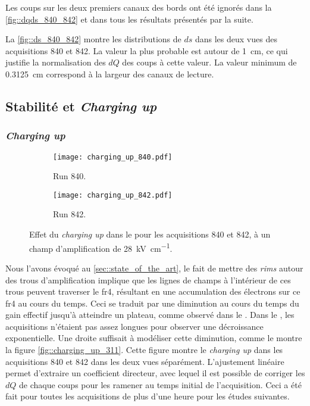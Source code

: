       Les coups sur les deux premiers canaux des bords ont été ignorés dans la \autoref{fig::dqds_840_842} et dans tous les résultats présentés par la suite.

      La \autoref{fig::ds_840_842} montre les distributions de $ds$ dans les deux vues des acquisitions 840 et 842. La valeur la plus probable est autour de \SI{1}{\centi\meter}, ce qui justifie la normalisation des $dQ$ des coups à cette valeur. La valeur minimum de \SI{0.3125}{\centi\meter} correspond à la largeur des canaux de lecture.

    \subsection{Stabilité et \textit{Charging up}}\label{sec::res-stab-cu}

      \subsubsection{\textit{Charging up}}

        \begin{figure}[htbp]
        \centering
          \begin{subfigure}[t]{0.5\textwidth}
            \centering
            \texttt{[image: charging\_up\_840.pdf]}
            \caption{Run 840.}
          \end{subfigure}\hfill
          \begin{subfigure}[t]{0.5\textwidth}
            \centering
            \texttt{[image: charging\_up\_842.pdf]}
            \caption{Run 842.}
          \end{subfigure}
          \caption[Effet du \textit{charging up} dans le \TOO{}]{\label{fig::charging_up_311}Effet du \textit{charging up} dans le \TOO{} pour les acquisitions 840 et 842, à un champ d'amplification de \SI{28}{\kilo\volt\per\centi\meter}.}
        \end{figure}
        
        Nous l'avons évoqué au \autoref{sec::state_of_the_art}, le fait de mettre des \textit{rims} autour des trous d'amplification implique que les lignes de champs à l'intérieur de ces trous peuvent traverser le \gls{fr4}, résultant en une accumulation des électrons sur ce \gls{fr4} au cours du temps. Ceci se traduit par une diminution au cours du temps du gain effectif jusqu'à atteindre un plateau, comme observé dans le \threeL{}\cite{Cantini2014}. Dans le \TOO{}, les acquisitions n'étaient pas assez longues pour observer une décroissance exponentielle. Une droite suffisait à modéliser cette diminution, comme le montre la figure \autoref{fig::charging_up_311}. Cette figure montre le \textit{charging up} dans les acquisitions 840 et 842 dans les deux vues séparément. L'ajustement linéaire permet d'extraire un coefficient directeur, avec lequel il est possible de corriger les $dQ$ de chaque coups pour les ramener au temps initial de l'acquisition. Ceci a été fait pour toutes les acquisitions de plus d'une heure pour les études suivantes. 

